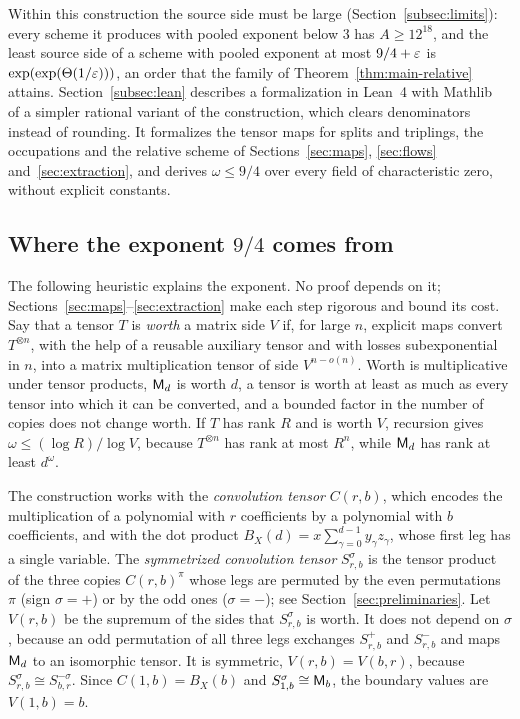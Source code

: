 Within this construction the source side must be large
(Section~\ref{subsec:limits}): every scheme it produces with pooled
exponent below \(3\) has \(A\ge12^{18}\), and the least source side of
a scheme with pooled exponent at most \(9/4+\varepsilon\) is
\(\exp(\exp(\Theta(1/\varepsilon)))\), an order that the family of
Theorem~\ref{thm:main-relative} attains. Section~\ref{subsec:lean}
describes a formalization in Lean~4 with Mathlib~\citep{Lean4,Mathlib}
of a simpler rational variant of the construction, which clears
denominators instead of rounding. It formalizes the tensor maps for
splits and triplings, the occupations and the relative scheme of
Sections~\ref{sec:maps}, \ref{sec:flows} and~\ref{sec:extraction}, and
derives \(\omega\le9/4\) over every field of characteristic zero,
without explicit constants.

\subsection{Where the exponent \texorpdfstring{\(9/4\)}{9/4} comes from}
\label{subsec:intro-heuristic}

The following heuristic explains the exponent. No proof depends on it;
Sections~\ref{sec:maps}--\ref{sec:extraction} make each step rigorous
and bound its cost. Say that a tensor \(T\) is \emph{worth} a matrix side \(V\) if, for
large \(n\), explicit maps convert \(T^{\otimes n}\), with the help of a
reusable auxiliary tensor and with losses subexponential in \(n\), into
a matrix multiplication tensor of side \(V^{n-o(n)}\). Worth is
multiplicative under tensor products, \(\mathsf M_d\) is worth \(d\), a tensor
is worth at least as much as every tensor into which it can be
converted, and a bounded factor in the number of copies does not change
worth. If \(T\) has rank \(R\) and is worth \(V\), recursion gives
\(\omega\le(\log R)/\log V\), because \(T^{\otimes n}\) has rank at
most \(R^n\), while \(\mathsf M_d\) has rank at least \(d^\omega\).

The construction works with the \emph{convolution tensor} \(C(r,b)\),
which encodes the multiplication of a polynomial with \(r\) coefficients
by a polynomial with \(b\) coefficients, and with the dot product
\(B_X(d)=x\sum_{\gamma=0}^{d-1}y_\gamma z_\gamma\), whose first leg has a
single variable. The \emph{symmetrized convolution tensor}
\(S^\sigma_{r,b}\) is the tensor product of the three copies
\(C(r,b)^\pi\) whose legs are permuted by the even permutations \(\pi\)
(sign \(\sigma=+\)) or by the odd ones (\(\sigma=-\)); see
Section~\ref{sec:preliminaries}. Let \(V(r,b)\) be the supremum of the
sides that \(S^\sigma_{r,b}\) is worth. It does not depend on
\(\sigma\), because an odd permutation of all three legs exchanges
\(S^+_{r,b}\) and \(S^-_{r,b}\) and maps \(\mathsf M_d\) to an isomorphic
tensor. It is symmetric, \(V(r,b)=V(b,r)\), because
\(S^\sigma_{r,b}\cong S^{-\sigma}_{b,r}\). Since \(C(1,b)=B_X(b)\) and
\(S^\sigma_{1,b}\cong\mathsf M_b\), the boundary values are \(V(1,b)=b\).

